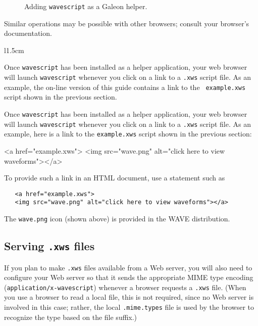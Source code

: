 \documentclass[twoside]{book}
\newcommand{\WAVE}{{\sf WAVE}\xspace}
\begin{document}
\begin{figure}
\centerline{}
\caption{Adding {\tt wavescript} as a Galeon helper.}
\label{fig:galeon-new-helper}
\end{figure}

Similar operations may be possible with other browsers;  consult your browser's
documentation.

\begin{latexonly}
\begin{wrapfigure}[3]{l}{1.5cm}
\mbox{}
\end{wrapfigure}
Once {\tt wavescript} has been installed as a helper application, your
web browser will launch {\tt wavescript} whenever you click on a link
to a {\tt .xws} script file.  As an example, 
the on-line version of this guide contains a link to the {\tt
example.xws} script shown in the previous section.  
\end{latexonly}
\begin{htmlonly}
Once {\tt wavescript} has been installed as a helper application, your
web browser will launch {\tt wavescript} whenever you click on a link
to a {\tt .xws} script file.  As an example, 
here is a link to the {\tt example.xws} script shown in the previous
section:
\end{htmlonly}
\begin{rawhtml}
   <a href="example.xws">
   <img src="wave.png" alt="click here to view waveforms"></a>
\end{rawhtml}
To provide such a link in an HTML document, use a statement such as
\begin{verbatim}
   <a href="example.xws">
   <img src="wave.png" alt="click here to view waveforms"></a>
\end{verbatim}
\begin{latexonly}
The {\tt wave.png} icon (shown above) is provided in the \WAVE{}
distribution.
\end{latexonly}

\subsection*{Serving {\tt .xws} files}
\label{sec:serving-xws}

If you plan to make {\tt .xws} files available from a Web server, you
will also need to configure your Web server so that it sends the
appropriate MIME type encoding ({\tt application/x-wavescript})
whenever a browser requests a {\tt .xws} file.  (When you use a
browser to read a local file, this is not required, since no Web
server is involved in this case; rather, the local {\tt .mime.types}
file is used by the browser to recognize the type based on the file
suffix.)
\end{document}
